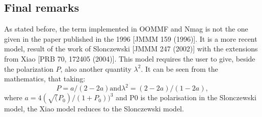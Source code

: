 \documentclass[11pt,oneside,openany]{article}
\begin{document}
\subsection{Final remarks}
As stated before, the term implemented in OOMMF and Nmag is not the one
given in the paper published in the 1996 [JMMM 159 (1996)]. It is a more
recent model, result of the work of Slonczewski [JMMM 247 (2002)] with the
extensions from Xiao [PRB 70, 172405 (2004)]. This model requires the user
to give, beside the polarization $P$, also another quantity $\lambda^2$.
It can be seen from the mathematics, that taking:
$$
P = a/(2 - 2a) \mathrm{ and } \lambda^2 = (2 - 2a)/(1 - 2a),
$$
where $a = 4 (\sqrt(P_0)/(1 + P_0))^3$ and P0 is the polarisation in the
Slonczewski model, the Xiao model reduces to the Slonczewski model.
\end{document}
